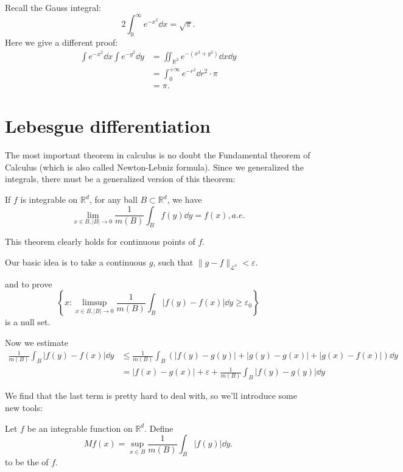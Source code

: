 Recall the Gauss integral:
\[
2\int_0^\infty e^{-x^2}\dd x = \sqrt{\pi}.
\]
Here we give a different proof:
\begin{align*}
    \int e^{-x^2}\dd x \int e^{-y^2}\dd y
	&= \iint_{\mathbb{R}^2} e^{-(x^2+y^2)}\dd x\dd y\\
	&= \int_{0}^{+\infty} e^{-r^2} \dd r^2 \cdot \pi\\
	&= \pi.
\end{align*}

\section{Lebesgue differentiation}
\label{sec:Lebesgue differentiation}

The most important theorem in calculus is no doubt the
Fundamental theorem of Calculus (which is also called Newton-Lebniz formula).
Since we generalized the integrals,
there must be a generalized version of this theorem:
\begin{theorem}
	If $f$ is integrable on $\mathbb{R}^d$,
	for any ball $B \subset \mathbb{R}^d$, we have
	\[
	\lim_{x\in B, |B|\to 0}\frac{1}{m(B)} \int_B f(y)\dd y = f(x), a.e.
	\]
\end{theorem}
This theorem clearly holds for continuous points of $f$.

Our basic idea is to take a continuous  $g$, such that
$\lVert g-f \rVert_{\mathcal{L}^1} <\varepsilon$.

and to prove
\[
\left\{x:
\limsup_{x\in B, |B|\to 0} \frac{1}{m(B)}\int_B|f(y)-f(x)|\dd y \ge \varepsilon_0
\right\}
\]
is a null set.

Now we estimate
\begin{align*}
    \frac{1}{m(B)}\int_B |f(y)-f(x)|\dd y
	&\le \frac{1}{m(B)}\int _B \left( |f(y)-g(y)|+|g(y)-g(x)|+|g(x)-f(x)| \right)\dd y
	\\
	&= |f(x)-g(x)| + \varepsilon + \frac{1}{m(B)}\int_B |f(y)-g(y)|\dd y
\end{align*}

We find that the last term is pretty hard to deal with,
so we'll introduce some new tools:
\begin{definition}
	Let $f$ be an integrable function on  $\mathbb{R}^d$. Define
	\[
	Mf(x) = \sup_{x\in B}\frac{1}{m(B)}\int_B |f(y)|\dd y.
	\]
	to be the  of $f$.
\end{definition}

